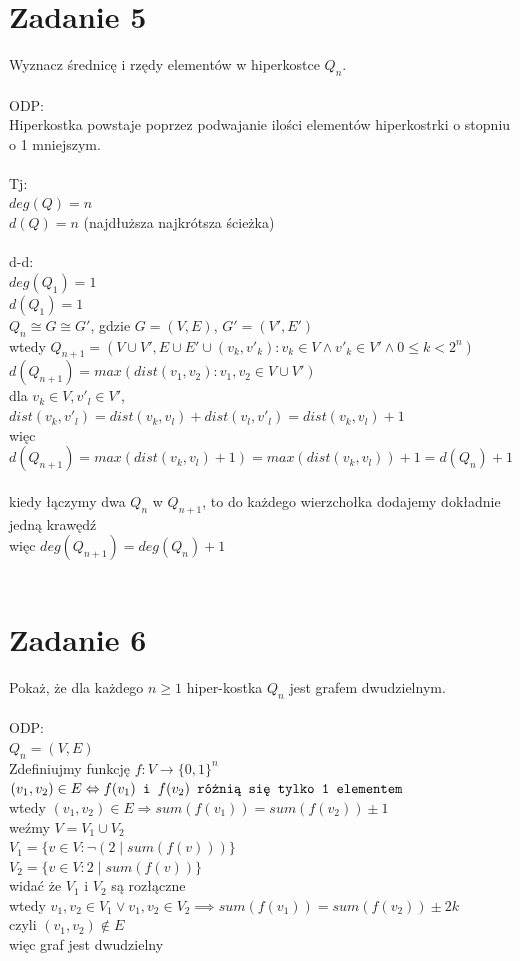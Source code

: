 \documentclass{article}
\begin{document}
\section{\centering Zadanie 5}
Wyznacz średnicę i rzędy elementów w hiperkostce $Q_{n}$.\\\\
ODP:\\
Hiperkostka powstaje poprzez podwajanie ilości elementów hiperkostrki o stopniu o 1 mniejszym.\\\\
Tj:\\
$deg(Q) = n$\\
$d(Q) = n$ (najdłuższa najkrótsza ścieżka)\\\\
d-d:\\
$deg(Q_1) = 1$\\
$d(Q_1) = 1$\\
$Q_n \cong G \cong G'$, gdzie $G = (V, E)$, $G' = (V', E')$\\
wtedy $Q_{n+1} = (V \cup V', E \cup E' \cup {(v_k, v'_k): v_k \in V \wedge v'_k \in V' \wedge 0 \leq k < 2^n})$\\
$d(Q_{n+1}) = max(dist(v_1, v_2): v_1,v_2 \in V \cup V')$\\
dla $v_k \in V, v'_l \in V'$, $dist(v_k, v'_l) = dist(v_k, v_l) + dist(v_l, v'_l) = dist(v_k, v_l) + 1$\\
więc $d(Q_{n+1}) = max(dist(v_k, v_l) + 1) = max(dist(v_k, v_l)) + 1 = d(Q_n) + 1$\\\\
kiedy łączymy dwa $Q_n$ w $Q_{n+1}$, to do każdego wierzchołka dodajemy dokładnie jedną krawędź\\
więc $deg(Q_{n+1}) = deg(Q_n) + 1$\\\\
\section{\centering Zadanie 6 }
Pokaż, że dla każdego $n \geq 1$ hiper-kostka $Q_{n}$ jest grafem dwudzielnym.\\\\
ODP:\\
$Q_n = (V, E)$\\
Zdefiniujmy funkcję $f: V \rightarrow \{ 0,1\} ^n$\\
$(v_1, v_2) \in E \Leftrightarrow f(v_1) \verb| i | f(v_2) \verb| różnią się tylko 1 elementem|$\\
wtedy $(v_1, v_2) \in E \Rightarrow sum(f(v_1)) = sum(f(v_2)) \pm 1$\\
weźmy $V = V_1 \cup V_2$\\
$V_1 = \{ v \in V: \neg (2 \mid sum(f(v)))\} $\\
$V_2 = \{ v \in V: 2 \mid sum(f(v))\} $\\
widać że $V_1$ i $V_2$ są rozłączne\\
wtedy $v_1,v_2 \in V_1 \lor v_1, v_2 \in V_2 \implies sum(f(v_1)) = sum(f(v_2)) \pm 2k$\\
czyli $(v_1,v_2) \notin E$\\
więc graf jest dwudzielny\\\\
\end{document}
